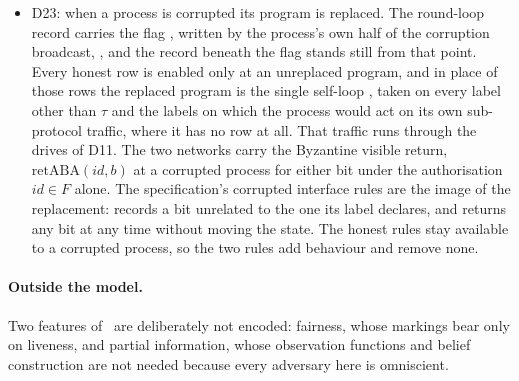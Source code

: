 \begin{itemize}
    That indefinite participation is the regime of ABDY22's Lemmas~4.6 and~E.5, which are stated under the hypothesis that no non-faulty process has terminated.
    Termination is the rule , which fires once the process's own return has fired and $2f+1$ DECIDED receipts are on its record (ABDY22's Definitions~3.1 and~3.2 and its note on termination), and whose effect is to set the flag alone.
    It stops the stage-side rules only: the DECIDED rules carry no termination guard, so a process that has terminated keeps relaying the payloads it holds.
    The rule carries the replacement guard of D23, so a process whose program has been replaced never terminates.
  \item D23: when a process is corrupted its program is replaced.
    The round-loop record carries the flag , written by the process's own half of the corruption broadcast, , and the record beneath the flag stands still from that point.
    Every honest row is enabled only at an unreplaced program, and in place of those rows the replaced program is the single self-loop , taken on every label other than $\tau$ and the labels on which the process would act on its own sub-protocol traffic, where it has no row at all.
    That traffic runs through the drives of D11.
    The two networks carry the Byzantine visible return, $\mathrm{retABA}(id,b)$ at a corrupted process for either bit under the authorisation $id \in F$ alone.
    The specification's corrupted interface rules are the image of the replacement:  records a bit unrelated to the one its label declares, and  returns any bit at any time without moving the state.
    The honest rules stay available to a corrupted process, so the two rules add behaviour and remove none.
\end{itemize}

\paragraph{Outside the model.}
Two features of~\cite{LeslieBP} are deliberately not encoded: fairness, whose markings bear only on liveness, and partial information, whose observation functions and belief construction are not needed because every adversary here is omniscient.


